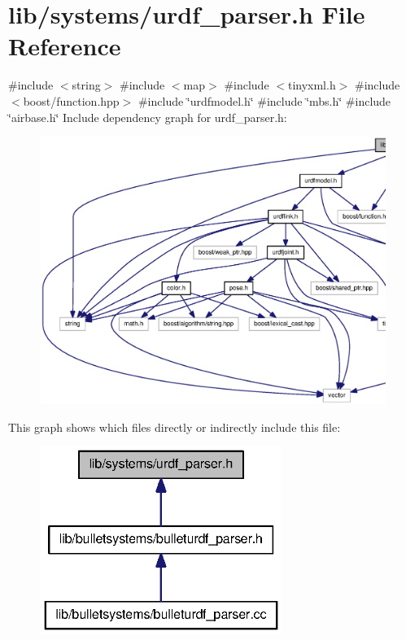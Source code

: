 \section{lib/systems/urdf\-\_\-parser.h \-File \-Reference}
\label{urdf__parser_8h}
{\ttfamily \#include $<$string$>$}\*
{\ttfamily \#include $<$map$>$}\*
{\ttfamily \#include $<$tinyxml.\-h$>$}\*
{\ttfamily \#include $<$boost/function.\-hpp$>$}\*
{\ttfamily \#include \char`\"{}urdfmodel.\-h\char`\"{}}\*
{\ttfamily \#include \char`\"{}mbs.\-h\char`\"{}}\*
{\ttfamily \#include \char`\"{}airbase.\-h\char`\"{}}\*
\-Include dependency graph for urdf\-\_\-parser.\-h\-:\nopagebreak
\begin{figure}[H]
\begin{center}
\leavevmode
\includegraphics[width=350pt]{urdf__parser_8h__incl}
\end{center}
\end{figure}
\-This graph shows which files directly or indirectly include this file\-:
\nopagebreak
\begin{figure}[H]
\begin{center}
\leavevmode
\includegraphics[width=222pt]{urdf__parser_8h__dep__incl}
\end{center}
\end{figure}
